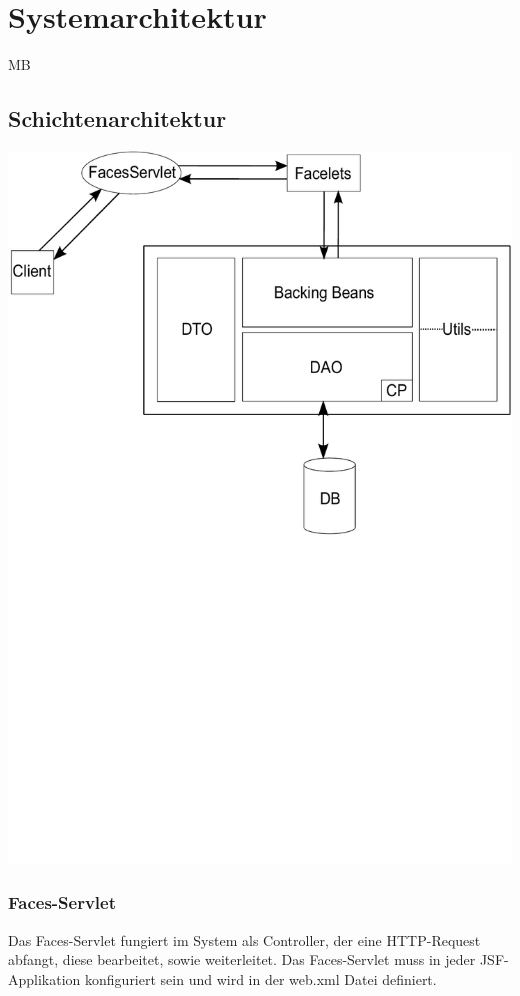 \chapter{Systemarchitektur}
\begin{tiny}
MB
\end{tiny}
\section{Schichtenarchitektur}
    \includegraphics[scale=0.50]{Grafiken/Schichtenarchitektur.pdf}
	\subsection{Faces-Servlet}
	    Das Faces-Servlet fungiert im System als Controller, der eine HTTP-Request abfangt, diese bearbeitet, sowie weiterleitet. Das Faces-Servlet muss in jeder JSF-Applikation konfiguriert sein und wird in der web.xml Datei definiert. 

